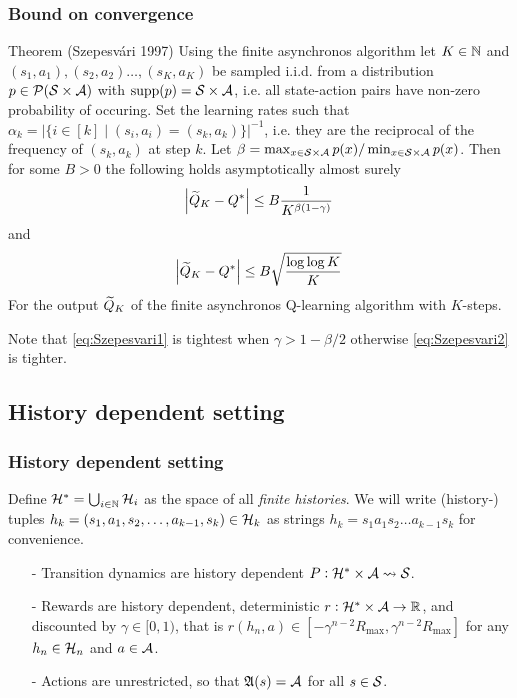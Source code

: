 \documentclass{beamer}[10]
\begin{document}
\begin{frame}
  \frametitle{Bound on convergence}
  \begingroup\scriptsize
  \begin{block}{Theorem (Szepesvári 1997)}
    Using the finite asynchronos algorithm
    let $K \in \mathbb{N}$ and
    $(s_1, a_1), (s_2, a_2) \dots, (s_K, a_K)$ be sampled i.i.d. from
    a distribution
    $p \in \mathcal{P}(\mathcal{S} \times \mathcal{A})$ with $\text{supp}(p) = \mathcal{S} \times \mathcal{A}$,
    i.e. all state-action pairs have non-zero probability of occuring.
    Set the learning rates such that
    $\alpha_k
    = |\{ i \in [k] \mid (s_i, a_i) = (s_k, a_k) \}|^{-1}$,
    i.e. they are the reciprocal of the frequency of $(s_k, a_k)$ at step $k$.
    Let $\beta = \max_{x \in \mathcal{S} \times \mathcal{A}} p(x) /
    \min_{x \in \mathcal{S} \times \mathcal{A}} p(x)$.
    Then for some $B > 0$ the following holds asymptotically almost
    surely
    \begin{equation}
      \abs{\widetilde{Q}_K - Q^*} \leq B \frac{1}{K^{\beta (1-\gamma)}}
      \label{eq:Szepesvari1}
    \end{equation}
    and
    \begin{equation}
      \abs{\widetilde{Q}_K - Q^*} \leq B \sqrt{\frac{\log \log K}{K}}
      \label{eq:Szepesvari2}
    \end{equation}
    For the output $\widetilde{Q}_K$ of the finite asynchronos Q-learning algorithm
    with $K$-steps.
  \end{block}
  Note that \cref{eq:Szepesvari1} is tightest when $\gamma > 1 - \beta/2$
  otherwise \cref{eq:Szepesvari2} is tighter.
  \endgroup
\end{frame}

\subsection{History dependent setting}

\begin{frame}
  \frametitle{History dependent setting}
  Define $\mathcal{H}^* = \bigcup_{i \in \mathbb{N}} \mathcal{H}_i$ as the space of all
  \emph{finite histories}.
  We will write (history-) tuples
  $h_k = (s_1, a_1, s_2, \dots, a_{k-1}, s_k) \in \mathcal{H}_k$
  as strings $h_k = s_1 a_1 s_2 \dots a_{k-1} s_k$ for convenience.
  \begin{itemize}
    \item[-] Transition dynamics are history dependent
      $P : \mathcal{H}^* \times \mathcal{A} \leadsto \mathcal{S}$.
    \item[-] Rewards are history dependent, deterministic
      $r : \mathcal{H}^* \times \mathcal{A} \to \mathbb{R}$,
      and discounted by $\gamma \in [0,1)$, that is 
      $r(h_n, a) \in [-\gamma^{n-2}R_{\max}, \gamma^{n-2} R_{\max}]$ for any
      $h_n \in \mathcal{H}_n$ and $a \in \mathcal{A}$.
    \item[-] Actions are unrestricted, so that
      $\frak{A}(s) = \mathcal{A}$ for all $s \in \mathcal{S}$.
  \end{itemize}
\end{frame}
\end{document}
